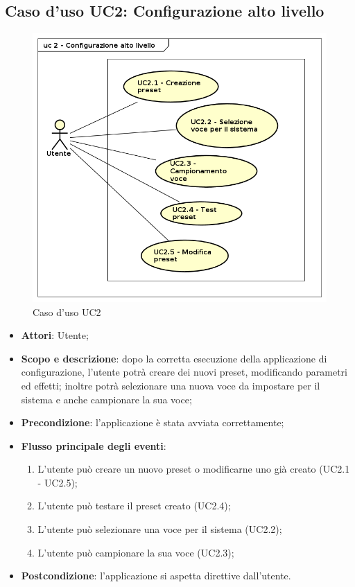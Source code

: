 \subsection{Caso d'uso UC2: Configurazione alto livello}

\begin{figure}[htbp]
\centering
\includegraphics[scale=0.5]{UseCase_17_03_2016/immagini/uc_2_configurazione_alto_livello.png}
\captionsetup{labelfont=bf}
\caption{Caso d'uso UC2}
\end{figure}

\begin{itemize}
\item \textbf{Attori}: Utente;
\item \textbf{Scopo e descrizione}: dopo la corretta esecuzione della applicazione di configurazione, l'utente potrà creare dei nuovi preset, modificando parametri ed effetti; inoltre potrà selezionare una nuova voce da impostare per il sistema e anche campionare la sua voce;
\item \textbf{Precondizione}: l'applicazione è stata avviata correttamente;
\item \textbf{Flusso principale degli eventi}:
\begin{enumerate}
\item L'utente può creare un nuovo preset o modificarne uno già creato (UC2.1 - UC2.5);
\item L'utente può testare il preset creato (UC2.4); 
\item L'utente può selezionare una voce per il sistema (UC2.2);
\item L'utente può campionare la sua voce (UC2.3);
\end{enumerate}
\item \textbf{Postcondizione}: l'applicazione si aspetta direttive dall'utente.
\end{itemize}


